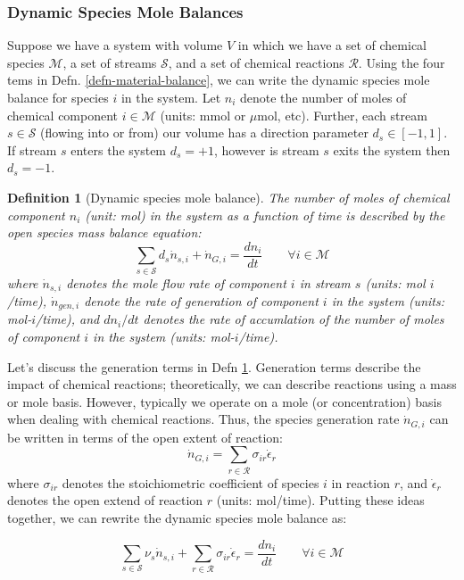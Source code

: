 \documentclass{article}[11pt]
\newtheorem{defn}{Definition}
\begin{document}
\subsubsection*{Dynamic Species Mole Balances}
Suppose we have a system with volume $V$ in which we have a set of chemical species $\mathcal{M}$, a set of streams $\mathcal{S}$, and a set of chemical reactions $\mathcal{R}$.
Using the four tems in Defn. \ref{defn-material-balance}, we can write the dynamic species mole balance for species $i$ in the system.
Let $n_{i}$ denote the number of moles of chemical component $i\in\mathcal{M}$ (units: mmol or  $\mu$mol, etc).
Further, each stream $s\in\mathcal{S}$ (flowing into or from) our volume has a direction parameter $d_{s}\in\left[-1,1\right]$. 
If stream $s$ enters the system $d_{s} = +1$, however is stream $s$ exits the system then $d_{s} = -1$.

\begin{defn}[Dynamic species mole balance]\label{defn-dynamic-species-mole-balance}
The number of moles of chemical component $n_{i}$ (unit: mol) in the system as a function of time is described by the 
open species mass balance equation:
\begin{equation}\label{eqn-species-mol-balance}
\sum_{s\in\mathcal{S}}d_{s}\dot{n}_{s,i} + \dot{n}_{G,i} = \frac{dn_{i}}{dt}
\qquad\forall{i}\in\mathcal{M}
\end{equation}
where $\dot{n}_{s,i}$ denotes the mole flow rate of component $i$ in stream $s$ (units: mol $i$/time),
$\dot{n}_{gen,i}$ denote the rate of generation of component $i$ in the system 
(units: mol-$i$/time), and $dn_{i}/dt$ denotes the rate of accumlation of the number of moles of component $i$ in the system (units: mol-$i$/time). 
\end{defn}

Let's discuss the generation terms in Defn \ref{defn-dynamic-species-mole-balance}. 
Generation terms describe the impact of chemical reactions; theoretically, we can describe reactions using a mass or mole basis. 
However, typically we operate on a mole (or concentration) basis when dealing with chemical reactions.
Thus, the species generation rate $\dot{n}_{G,i}$ can be written in terms of the open extent of reaction:
\begin{equation}\label{eqn-open-extent-species}
\dot{n}_{G,i} = \sum_{r\in\mathcal{R}}\sigma_{ir}\dot{\epsilon}_{r}
\end{equation}
where $\sigma_{ir}$ denotes the stoichiometric coefficient of species $i$ in reaction $r$, and $\dot{\epsilon}_{r}$ denotes the open extend of reaction $r$ (units: mol/time).
Putting these ideas together, we can rewrite the dynamic species mole balance as:
\begin{mdframed}[backgroundcolor=lgray]
\begin{equation}\label{eqn-dynamic-smb-with-extent}
\sum_{s\in\mathcal{S}}\nu_{s}\dot{n}_{s,i} + \sum_{r\in\mathcal{R}}\sigma_{ir}\dot{\epsilon}_{r} = \frac{dn_{i}}{dt}\qquad\forall{i\in\mathcal{M}}
\end{equation}
\end{mdframed}
\end{document}
